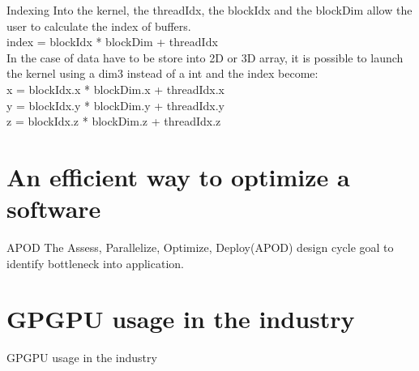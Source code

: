 \documentclass{beamer}
\begin{document}
\begin{frame}{Indexing}
	Into the kernel, the threadIdx, the blockIdx and the blockDim allow the user to calculate the index of buffers.\\
	index = blockIdx * blockDim + threadIdx\\
	In the case of data have to be store into 2D or 3D array, it is possible to launch the kernel using a dim3 instead of a int and the index become:\\
	x = blockIdx.x * blockDim.x + threadIdx.x\\
	y = blockIdx.y * blockDim.y + threadIdx.y\\
	z = blockIdx.z * blockDim.z + threadIdx.z\\
\end{frame}

\section{An efficient way to optimize a software}
\begin{frame}{APOD}
	The Assess, Parallelize, Optimize, Deploy(APOD) design cycle goal to identify bottleneck into application. 
\end{frame}

\section{GPGPU usage in the industry}
\begin{frame}{GPGPU usage in the industry}
	
\end{frame}
\end{document}
